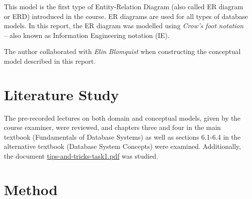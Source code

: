 \documentclass[a4paper]{scrartcl}
\begin{document}
This model is the first type of Entity-Relation Diagram (also called ER diagram or
ERD) introduced in the course. 
ER diagrams are used for all types of database
models.  
In this report, the ER diagram was modelled using \emph{Crow's foot notation}
-- also known as Information Engineering notation (IE).

The author collaborated with
\emph{Elin Blomquist}
when constructing the conceptual model described in this report.



\section{Literature Study}

The pre-recorded lectures on both domain and conceptual models, given by the
course examiner, were reviewed, and chapters three and four in the main textbook
(Fundamentals of Database Systems) as well as sections 6.1-6.4 in the
alternative textbook (Database System Concepts) were examined. 
Additionally, the document 
\href{https://canvas.kth.se/courses/43013/files/7095362?wrap=1}{tips-and-tricks-task1.pdf}
was studied.

\section{Method}
\label{sec:method}

\end{document}
